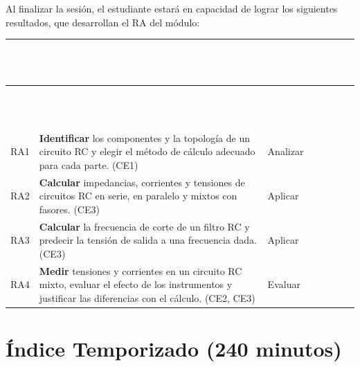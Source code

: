 \documentclass[11pt,letterpaper]{article}
\begin{document}
Al finalizar la sesión, el estudiante estará en capacidad de lograr los siguientes resultados, que desarrollan el RA del módulo:

\begin{xltabular}{\linewidth}{>{\raggedright\arraybackslash}p{1.1cm}>{\raggedright\arraybackslash}X>{\raggedright\arraybackslash}p{3.9cm}}
 \textcolor{white}{\textbf{\#}} & \textcolor{white}{\textbf{Resultado de aprendizaje}} & \textcolor{white}{\textbf{Nivel (Taxonomía de Bloom)}} \\
\endfirsthead
{} \textcolor{white}{\textbf{\#}} & \textcolor{white}{\textbf{Resultado de aprendizaje}} & \textcolor{white}{\textbf{Nivel (Taxonomía de Bloom)}} \\
\endhead
\bottomrule
\endlastfoot
  RA1 & \textbf{Identificar} los componentes y la topología de un circuito RC y elegir el método de cálculo adecuado para cada parte. (CE1) & Analizar \\
   RA2 & \textbf{Calcular} impedancias, corrientes y tensiones de circuitos RC en serie, en paralelo y mixtos con fasores. (CE3) & Aplicar \\
  RA3 & \textbf{Calcular} la frecuencia de corte de un filtro RC y predecir la tensión de salida a una frecuencia dada. (CE3) & Aplicar \\
   RA4 & \textbf{Medir} tensiones y corrientes en un circuito RC mixto, evaluar el efecto de los instrumentos y justificar las diferencias con el cálculo. (CE2, CE3) & Evaluar \\
\end{xltabular}

\section{Índice Temporizado (240 minutos)}
\end{document}

